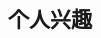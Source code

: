 \documentclass[11pt,a4paper,sans]{moderncv}   %
\begin{document}
\begin{CJK}{UTF8}{gbsn}

\section{个人兴趣}





%


\clearpage
\end{CJK}
\end{document}
